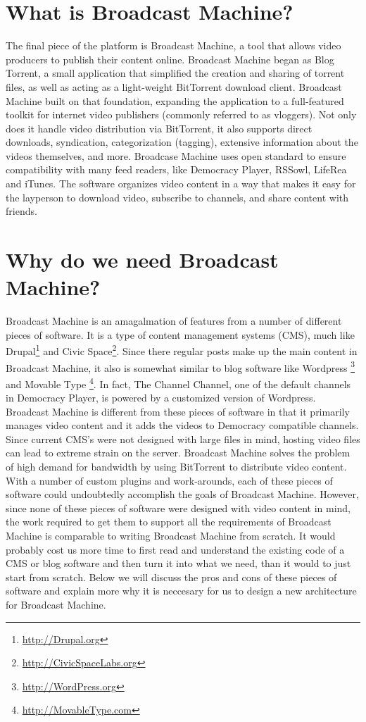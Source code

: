 \documentclass[a4paper,12pt]{report}
\begin{document}
\section{What is Broadcast Machine?}
The final piece of the platform is Broadcast Machine, a tool that allows video producers to publish their content online.
Broadcast Machine began as Blog Torrent, a small application that simplified the creation and sharing of torrent files, as well as acting as a light-weight BitTorrent download client.
Broadcast Machine built on that foundation, expanding the application to a full-featured toolkit for internet video publishers (commonly referred to as vloggers).
Not only does it handle video distribution via BitTorrent, it also supports direct downloads, syndication, categorization (tagging), extensive information about the videos themselves, and more.
Broadcase Machine uses open standard to ensure compatibility with many feed readers, like Democracy Player, RSSowl, LifeRea and iTunes.
The software organizes video content in a way that makes it easy for the layperson to download video, subscribe to channels, and share content with friends.

\section {Why do we need Broadcast Machine?}
    Broadcast Machine is an amagalmation of features from a number of different pieces of software.
It is a type of content management systems (CMS), much like Drupal\footnote{\url{http://Drupal.org}} and Civic Space\footnote{\url{http://CivicSpaceLabs.org} }.
Since there regular posts make up the main content in Broadcast Machine, it also is somewhat similar to blog software like Wordpress \footnote{\url{http://WordPress.org}} and Movable Type \footnote{\url{ http://MovableType.com}}.
In fact, The Channel Channel, one of the default channels in Democracy Player, is powered by a customized version of Wordpress.
Broadcast Machine is different from these pieces of software in that it primarily manages video content and it adds the videos to Democracy compatible channels.
Since current CMS's were not designed with large files in mind, hosting video files can lead to extreme strain on the server.
Broadcast Machine solves the problem of high demand for bandwidth by using BitTorrent to distribute video content.
With a number of custom plugins and work-arounds, each of these pieces of software could undoubtedly accomplish the goals of Broadcast Machine.
However, since none of these pieces of software were designed with video content in mind, the work required to get them to support all the requirements of Broadcast Machine is comparable to writing Broadcast Machine from scratch.
It would probably cost us more time to first read and understand the existing code of a CMS or blog software and then turn it into what we need, than it would to just start from scratch.
Below we will discuss the pros and cons of these pieces of software and explain more why it is neccesary for us to design a new architecture for Broadcast Machine.
	
\end{document}
